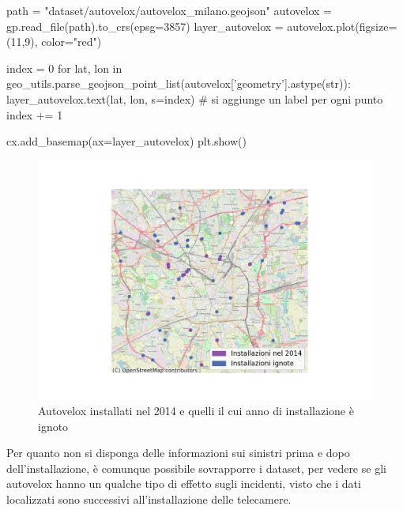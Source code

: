 \documentclass[a4paper,12pt]{report}
\begin{document}
\begin{code}[language=Python]
path = "dataset/autovelox/autovelox_milano.geojson"
autovelox = gp.read_file(path).to_crs(epsg=3857)
layer_autovelox = autovelox.plot(figsize=(11,9), color="red")
    
index = 0
for lat, lon in geo_utils.parse_geojson_point_list(autovelox['geometry'].astype(str)):
    layer_autovelox.text(lat, lon, s=index)
    # si aggiunge un label per ogni punto
    index += 1
    
cx.add_basemap(ax=layer_autovelox)
plt.show()
\end{code}

\begin{figure}
    \includegraphics[width=\linewidth]{../src/autovelox/autovelox_2014.png}
    \caption{Autovelox installati nel 2014 e quelli il cui anno di installazione è ignoto}
    \label{fig:autovelox-indici}
\end{figure}

Per quanto non si disponga delle informazioni sui sinistri prima e dopo dell'installazione, 
è comunque possibile sovrapporre i dataset, per vedere se gli autovelox 
hanno un qualche tipo di effetto sugli incidenti, visto che i dati 
localizzati sono successivi all'installazione delle telecamere.
\end{document}
